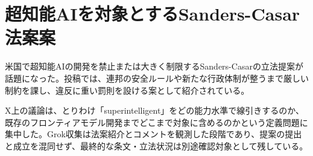 \section{超知能AIを対象とするSanders-Casar法案案}

米国で超知能AIの開発を禁止または大きく制限するSanders-Casarの立法提案が話題になった。投稿では、連邦の安全ルールや新たな行政体制が整うまで厳しい制約を課し、違反に重い罰則を設ける案として紹介されている。

X上の議論は、とりわけ「superintelligent」をどの能力水準で線引きするのか、既存のフロンティアモデル開発までどこまで対象に含めるのかという定義問題に集中した。Grok収集は法案紹介とコメントを観測した段階であり、提案の提出と成立を混同せず、最終的な条文・立法状況は別途確認対象として残している。

